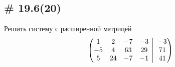 \documentclass[a4paper,12pt]{article}
\newcommand{\BigMiddleThree}{\;\left|\vphantom{\begin{pmatrix} 0\\0\\0 \end{pmatrix}}\right.\;}
\begin{document}
  
  \subsection{\# 19.6(20)}
  
  Решить систему с расширенной матрицей
  \[
    \left(
      \begin{matrix}
        1 & 2 & -7 & -3\\
        -5 & 4 & 63 & 29\\
        5 & 24 & -7 & -1
      \end{matrix}
      \BigMiddleThree
      \begin{matrix}
        -3\\
        71\\
        41
      \end{matrix}
    \right)
  \]
  
\end{document}
